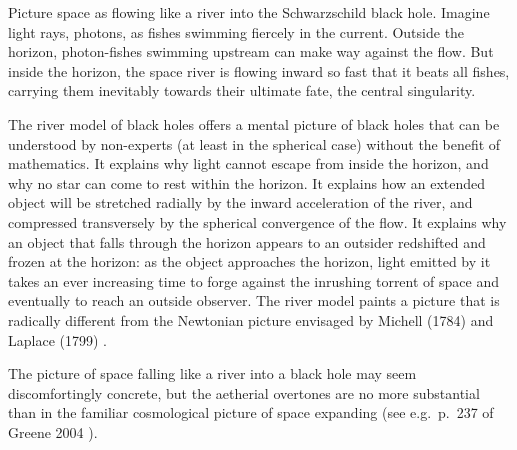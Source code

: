 \documentclass[twocolumn,showpacs,preprintnumbers,amsmath,amssymb,prb]{revtex4}
\begin{document}
\blackholefishiesfig

Picture space as flowing like a river into the Schwarzschild black hole.
Imagine light rays, photons, as fishes swimming fiercely in the current.
Outside the horizon,
photon-fishes swimming upstream can make way against the flow.
But inside the horizon, the space river is flowing inward so fast that it
beats all fishes, carrying them inevitably towards their ultimate fate, the
central singularity.

The river model of black holes offers a mental picture of black holes
that can be understood by non-experts
(at least in the spherical case)
without the benefit of mathematics.
It explains why light cannot escape from inside the horizon,
and why no star can come to rest within the horizon.
It explains how an extended object will be stretched radially
by the inward acceleration of the river,
and compressed transversely by the spherical convergence of the flow.
It explains why an object that falls through the horizon appears to an outsider
redshifted and frozen at the horizon:
as the object approaches the horizon,
light emitted by it takes an ever increasing time to forge against the
inrushing torrent of space and eventually to reach an outside observer.
The river model paints a picture that is radically different
from the Newtonian picture envisaged by
Michell (1784) \cite{Michell}
and Laplace (1799) \cite{Laplace}.

The picture of space falling like a river into a black hole
may seem discomfortingly concrete,
but the aetherial overtones are no more substantial
than in the familiar cosmological picture of space expanding
(see e.g.\ p.~237 of Greene 2004
\cite{Greene}).
\end{document}
